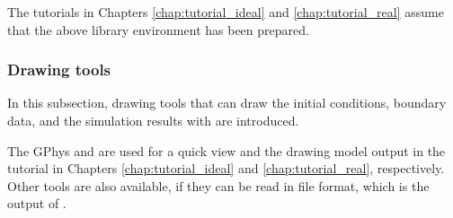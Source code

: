 The tutorials in Chapters \ref{chap:tutorial_ideal} and \ref{chap:tutorial_real} assume that the above library environment has been prepared.



\subsubsection{Drawing tools}

In this subsection, drawing tools that can draw the initial conditions, boundary data, and the simulation results with \scalerm are introduced.

The GPhys and \grads are used for a quick view
and the drawing model output in the tutorial in Chapters \ref{chap:tutorial_ideal} and \ref{chap:tutorial_real}, respectively.
Other tools are also available,
if they can be read in \netcdf file format, which is the output of \scalerm.

